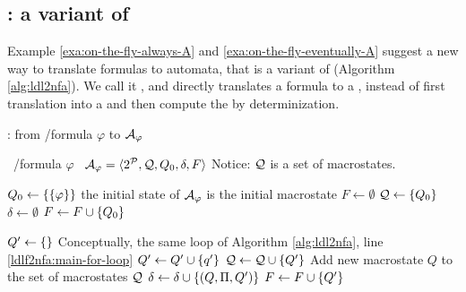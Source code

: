 \subsection{\LDLfToDFA: a variant of \LDLfToNFA}\label{sect:llf2dfa}

Example \ref{exa:on-the-fly-always-A} and \ref{exa:on-the-fly-eventually-A} suggest a new way to translate \LLf formulas to automata, that is a variant of \LDLfToNFA (Algorithm \ref{alg:ldl2nfa}). We call it \LDLfToDFA, and directly translates a \LLf formula to a \DFA, instead of first translation into a \NFA and then compute the \DFA by determinization.

\begin{algorithm}
	\caption{\LDLfToDFA: from \LTLf/\LDLf formula $\varphi$ to \DFA $\mathcal{A}_\varphi$}
	\label{alg:ldlf2dfa}
	\begin{algorithmic}[1]
		\State \algInput\ \LDLf/\LTLf formula $\varphi$
		\State \algOutput\ \DFA $\mathcal{A}_\varphi = \langle 2^{\mathcal{P}}, \mathcal{Q}, Q_0, \delta, F \rangle$ \Comment Notice: $\mathcal{Q}$ is a set of macrostates.
		
		\State $Q_0 \gets \{\{\varphi\}\}$ \Comment the initial state of $\mathcal{A}_\varphi$ is the initial macrostate
		\State $F \gets \emptyset$
		\State $\mathcal{Q} \gets \{Q_0\}$
		\State $\delta \gets \emptyset$
		 \label{ldlf2dfa:delta-eps-init}
			\State $F \gets F \cup \{Q_0\}$
		\EndIf
		
				\State $Q' \gets \{\}$
				 \label{ldlf2dfa:main-for-loop}\Comment Conceptually, the same loop of Algorithm \ref{alg:ldl2nfa}, line \ref{ldlf2nfa:main-for-loop}
					 \label{ldlf2dfa:delta-for-loop}
						\State $Q' \gets Q' \cup \{q'\}$
					\EndIf
				\EndFor
				\State $\mathcal{Q} \gets \mathcal{Q} \cup \{Q'\}$ \Comment Add new macrostate  $Q$ to the set of macrostates $\mathcal{Q}$
				\State $\delta \gets \delta \cup \{(Q, \Pi, Q')\}$
				 \label{ldlf2dfa:delta-eps-end}
					\State $F \gets F \cup \{Q'\}$
				\EndIf
			\EndFor
		
		\EndWhile
		
	\end{algorithmic}
	
\end{algorithm}
